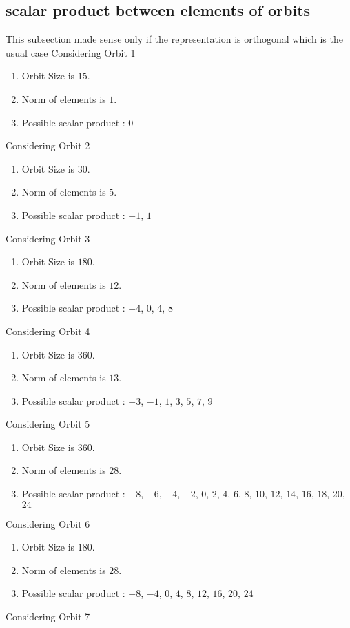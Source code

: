 \documentclass[12pt]{article}
\begin{document}
\subsection{scalar product between elements of orbits}
\noindent This subsection made sense only if the representation is orthogonal which is the usual case
Considering Orbit 1
\begin{enumerate}
\item Orbit Size is $15$.
\item Norm of elements is $1$.
\item Possible scalar product : $0$
\end{enumerate}
Considering Orbit 2
\begin{enumerate}
\item Orbit Size is $30$.
\item Norm of elements is $5$.
\item Possible scalar product : $-1$, $1$
\end{enumerate}
Considering Orbit 3
\begin{enumerate}
\item Orbit Size is $180$.
\item Norm of elements is $12$.
\item Possible scalar product : $-4$, $0$, $4$, $8$
\end{enumerate}
Considering Orbit 4
\begin{enumerate}
\item Orbit Size is $360$.
\item Norm of elements is $13$.
\item Possible scalar product : $-3$, $-1$, $1$, $3$, $5$, $7$, $9$
\end{enumerate}
Considering Orbit 5
\begin{enumerate}
\item Orbit Size is $360$.
\item Norm of elements is $28$.
\item Possible scalar product : $-8$, $-6$, $-4$, $-2$, $0$, $2$, $4$, $6$, $8$, $10$, $12$, $14$, $16$, $18$, $20$, $24$
\end{enumerate}
Considering Orbit 6
\begin{enumerate}
\item Orbit Size is $180$.
\item Norm of elements is $28$.
\item Possible scalar product : $-8$, $-4$, $0$, $4$, $8$, $12$, $16$, $20$, $24$
\end{enumerate}
Considering Orbit 7
\end{document}
